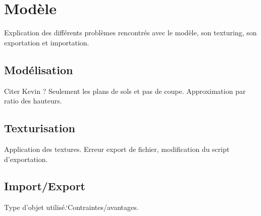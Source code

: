 \section{Modèle}
Explication des différents problèmes rencontrés avec le modèle, son texturing, son exportation et importation.

\subsection{Modélisation}
Citer Kevin ?
Seulement les plans de sols et pas de coupe. Approximation par ratio des hauteurs.

\subsection{Texturisation}
Application des textures.
Erreur export de fichier, modification du script d'exportation.

\subsection{Import/Export}
Type d'objet utilisé.`Contraintes/avantages.